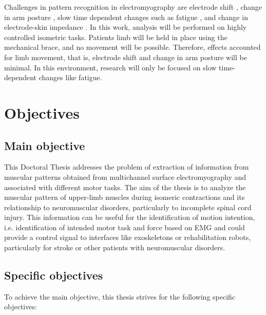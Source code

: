 Challenges in pattern recognition in electromyography are electrode shift \citep{Hargrove2008, Young2011}, change in arm posture \citep{Fougner2011}, slow time dependent changes \citep{Farina2014} such as fatigue \citep{Tkach2010}, and change in electrode-skin impedance \citep{Clancy2002b}. In this work, analysis will be performed on highly controlled isometric tasks. Patients limb will be held in place using the mechanical brace, and no movement will be possible. Therefore, effects accounted for limb movement, that is, electrode shift and change in arm posture will be minimal. In this environment, research will only be focused on slow time-dependent changes like fatigue. 


     \section{Objectives}
     
     	\subsection*{Main objective}

This Doctoral Thesis addresses the problem of extraction of information from muscular patterns obtained from multichannel surface electromyography and associated with different motor tasks. The aim of the thesis is to analyze the muscular pattern of upper-limb muscles during isomeric contractions and its relationship to neuromuscular disorders, particularly to incomplete spinal cord injury. This information can be useful for the identification of motion intention, i.e. identification of intended motor task and force based on EMG and could provide a control signal to interfaces like exoskeletons or rehabilitation robots, particularly for stroke or other patients with neuromuscular disorders.




        
        \subsection*{Specific objectives}
        
To achieve the main objective, this thesis strives for the following specific objectives:

